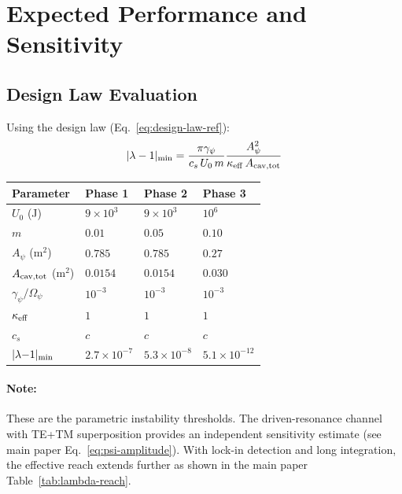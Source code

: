 \documentclass[11pt,a4paper]{article}
\begin{document}
\section{Expected Performance and Sensitivity}

\subsection{Design Law Evaluation}

Using the design law (Eq.~\ref{eq:design-law-ref}):
\begin{equation}
|\lambda - 1|_{\rm min} = \frac{\pi\gamma_\psi}{c_s\,U_0\,m}
\frac{A_\psi^2}{\kappa_{\rm eff}\,A_{\rm cav,tot}}
\label{eq:design-law-ref}
\end{equation}

\begin{longtable}{p{}p{}p{}p{}}
\toprule
\textbf{Parameter} & \textbf{Phase 1} & \textbf{Phase 2} & \textbf{Phase 3} \\
\midrule
\endhead
$U_0$ (J) & $9 \times 10^3$ & $9 \times 10^3$ & $10^6$ \\
$m$ & $0.01$ & $0.05$ & $0.10$ \\
$A_\psi$ (m$^2$) & $0.785$ & $0.785$ & $0.27$ \\
$A_{\rm cav,tot}$ (m$^2$) & $0.0154$ & $0.0154$ & $0.030$ \\
$\gamma_\psi/\Omega_\psi$ & $10^{-3}$ & $10^{-3}$ & $10^{-3}$ \\
$\kappa_{\rm eff}$ & $1$ & $1$ & $1$ \\
$c_s$ & $c$ & $c$ & $c$ \\
\midrule
$|\lambda{-}1|_{\rm min}$ & $2.7 \times 10^{-7}$ & $5.3 \times 10^{-8}$
& $5.1 \times 10^{-12}$ \\
\bottomrule
\end{longtable}

\paragraph{Note:} These are the parametric instability thresholds.
The driven-resonance channel with TE+TM superposition provides
an independent sensitivity estimate (see main paper
Eq.~\ref{eq:psi-amplitude}).  With lock-in detection and long
integration, the effective reach extends further as shown in
the main paper Table~\ref{tab:lambda-reach}.
\end{document}
